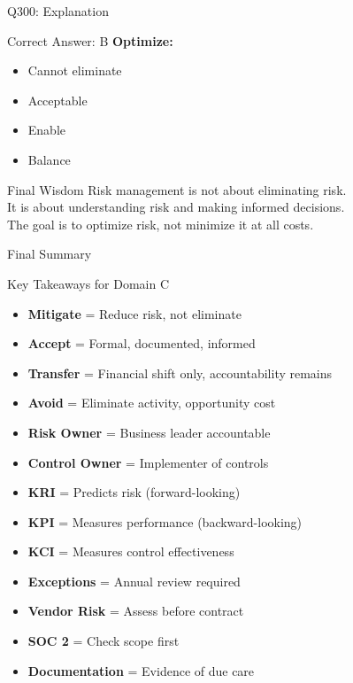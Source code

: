 \documentclass{beamer}
\begin{document}
	\begin{frame}{Q300: Explanation}
		\begin{block}{Correct Answer: B}
			\textbf{Optimize:}
			\begin{itemize}
				\item Cannot eliminate
				\item Acceptable
				\item Enable
				\item Balance
			\end{itemize}
		\end{block}
		\begin{alertblock}{Final Wisdom}
			Risk management is not about eliminating risk.\\
			It is about understanding risk and making informed decisions.\\
			The goal is to optimize risk, not minimize it at all costs.
		\end{alertblock}
	\end{frame}
	
	\begin{frame}{Final Summary}
		\begin{block}{Key Takeaways for Domain C}
			\begin{itemize}
				\item \textbf{Mitigate} = Reduce risk, not eliminate
				\item \textbf{Accept} = Formal, documented, informed
				\item \textbf{Transfer} = Financial shift only, accountability remains
				\item \textbf{Avoid} = Eliminate activity, opportunity cost
				\item \textbf{Risk Owner} = Business leader accountable
				\item \textbf{Control Owner} = Implementer of controls
				\item \textbf{KRI} = Predicts risk (forward-looking)
				\item \textbf{KPI} = Measures performance (backward-looking)
				\item \textbf{KCI} = Measures control effectiveness
				\item \textbf{Exceptions} = Annual review required
				\item \textbf{Vendor Risk} = Assess before contract
				\item \textbf{SOC 2} = Check scope first
				\item \textbf{Documentation} = Evidence of due care
			\end{itemize}
		\end{block}
	\end{frame}
	
\end{document}
